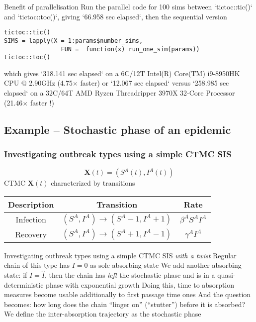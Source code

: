 \documentclass[aspectratio=169]{beamer}\usepackage[]{graphicx}\usepackage[]{xcolor}
\begin{document}

\begin{frame}[fragile]{Benefit of parallelisation}
    Run the parallel code for 100 sims between `tictoc::tic()` and `tictoc::toc()`, giving `66.958 sec elapsed`, then the sequential version
\begin{lstlisting}
tictoc::tic()
SIMS = lapply(X = 1:params$number_sims,
                FUN =  function(x) run_one_sim(params))
tictoc::toc()
\end{lstlisting}
    which gives `318.141 sec elapsed` on a 6C/12T Intel(R) Core(TM) i9-8950HK CPU @ 2.90GHz (4.75$\times$ faster) or `12.067 sec elapsed` versus `258.985 sec elapsed` on a 32C/64T AMD Ryzen Threadripper 3970X 32-Core Processor (21.46$\times$ faster !)
\end{frame}


\subsection{Example -- Stochastic phase of an epidemic}

\nocite{ArinoMilliken2022b}


\begin{frame}
\frametitle{Investigating outbreak types using a simple CTMC SIS}
\[
\mathbf{X}(t)=\left(S^A(t),I^A(t)\right)
\]
\vfill
CTMC $\mathbf{X}(t)$ characterized by transitions
\begin{center}
  \begin{tabular}{ccc}
    \toprule
    Description & Transition & Rate \\
    \midrule
    Infection & $\left(S^A,I^A\right)\to \left(S^A-1,I^A+1\right)$ & $\beta^AS^AI^A$ \\
    Recovery & $\left(S^A,I^A\right)\to \left(S^A+1,I^A-1\right)$ & $\gamma^AI^A$ \\
    \bottomrule
  \end{tabular}
\end{center}
\end{frame}

\begin{frame}{Investigating outbreak types using a simple CTMC SIS \emph{with a twist}}
Regular chain of this type has $I=0$ as sole absorbing state
\vfill
We add another absorbing state: if $I=\hat I$, then the chain has \emph{left} the stochastic phase and is in a quasi-deterministic phase with exponential growth
\vfill
Doing this, time to absorption measures become usable additionally to first passage time ones
\vfill
And the question becomes: how long does the chain ``linger on'' (``stutter'') before it is absorbed? We define the inter-absorption trajectory as the stochastic phase
\end{frame}
\end{document}
